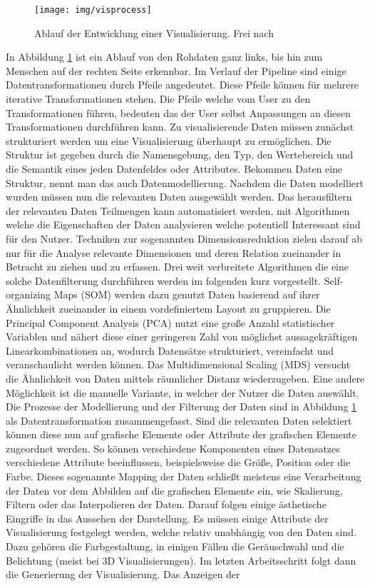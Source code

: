 \documentclass[draft=false
              ,paper=a4
              ,twoside=false
              ,fontsize=11pt
              ,headsepline
              ,BCOR10mm
              ,DIV11
              ]{scrbook}
\begin{document}
\begin{figure}[htbp]
  \centering
  \texttt{[image: img/visprocess]}
  \caption{Ablauf der Entwicklung einer Visualisierung. Frei nach \cite{card_readings_1999}}
  \label{fig:visprocess}
\end{figure}

In Abbildung \ref{fig:visprocess} ist ein Ablauf von den Rohdaten ganz links, bis hin zum Menschen auf der rechten Seite erkennbar. Im Verlauf der Pipeline sind einige Datentransformationen durch Pfeile angedeutet. Diese Pfeile können für mehrere iterative Transformationen stehen. Die Pfeile welche vom User zu den Transformationen führen, bedeuten das der User selbst Anpassungen an diesen Transformationen durchführen kann. 
Zu visualisierende Daten müssen zunächst strukturiert werden um eine Visualisierung überhaupt zu ermöglichen. Die Struktur ist gegeben durch die Namensgebung, den Typ, den Wertebereich und die Semantik eines jeden Datenfeldes oder Attributes. Bekommen Daten eine Struktur, nennt man das auch Datenmodellierung. Nachdem die Daten modelliert wurden müssen nun die relevanten Daten ausgewählt werden. Das herausfiltern der relevanten Daten Teilmengen kann automatisiert werden, mit Algorithmen welche die Eigenschaften der Daten analysieren welche potentiell Interessant sind für den Nutzer. Techniken zur sogenannten Dimensionsreduktion zielen darauf ab nur für die Analyse relevante Dimensionen und deren Relation zueinander in Betracht zu ziehen und zu erfassen. Drei weit verbreitete Algorithmen die eine solche Datenfilterung durchführen werden im folgenden kurz vorgestellt. Self-organizing Maps (SOM) \cite{kohonen_self-organizing_1998} werden dazu genutzt Daten basierend auf ihrer Ähnlichkeit zueinander in einem vordefiniertem Layout zu gruppieren. Die Principal Component Analysis (PCA) \cite{jolliffe_principal_2010} nutzt eine große Anzahl statistischer Variablen und nähert diese einer geringeren Zahl von möglichst aussagekräftigen Linearkombinationen an, wodurch Datensätze strukturiert, vereinfacht und veranschaulicht werden können. Das Multidimensional Scaling (MDS) \cite{borg_modern_2005} versucht die Ähnlichkeit von Daten mittels räumlicher Distanz wiederzugeben. Eine andere Möglichkeit ist die manuelle Variante, in welcher der Nutzer die Daten auswählt. Die Prozesse der Modellierung und der Filterung der Daten sind in Abbildung \ref{fig:visprocess} als Datentransformation zusammengefasst. Sind die relevanten Daten selektiert können diese nun auf grafische Elemente oder Attribute der grafischen Elemente zugeordnet werden. So können verschiedene Komponenten eines Datensatzes verschiedene Attribute beeinflussen, beispielsweise die Größe, Position oder die Farbe. Dieses sogenannte Mapping der Daten schließt meistens eine Verarbeitung der Daten vor dem Abbilden auf die grafischen Elemente ein, wie Skalierung, Filtern oder das Interpolieren der Daten. Darauf folgen einige ästhetische Eingriffe in das Aussehen der Darstellung. Es müssen einige Attribute der Visualisierung festgelegt werden, welche relativ unabhängig von den Daten sind. Dazu gehören die Farbgestaltung, in einigen Fällen die Geräuschwahl und die Belichtung (meist bei 3D Visualisierungen). Im letzten Arbeitsschritt folgt dann die Generierung der Visualisierung. Das Anzeigen der 
\end{document}
